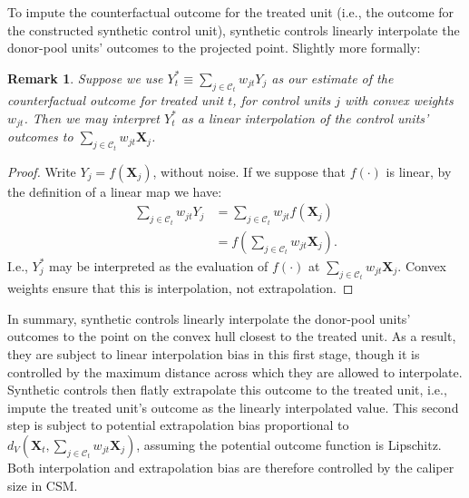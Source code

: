 \documentclass{article}
\newtheorem{remark}{Remark}
\newcommand{\Xt}{\mathbf{X}_t}
\newcommand{\Xj}{\mathbf{X}_j}
\newcommand{\Ct}{\mathcal{C}_{t}}
\newcommand{\note}[1]{\textcolor{red}{\textit{#1}}}
\begin{document}
To impute the counterfactual outcome for the treated unit (i.e., the outcome for the constructed synthetic control unit), synthetic controls linearly interpolate the donor-pool units' outcomes to the projected point.
Slightly more formally:
\begin{remark}
\label{rem:lin_interp}
    Suppose we use $Y_t^* \equiv \sum_{j \in \Ct} w_{jt} Y_j$ as our estimate of the counterfactual outcome for treated unit $t$, for control units $j$ with convex weights $w_{jt}$.
    Then we may interpret $Y_t^*$ as a linear interpolation of the control units' outcomes to $\sum_{j \in \Ct} w_{jt} \Xj$.
\end{remark}
\begin{proof}
    Write $Y_j = f(\Xj)$, without noise.
    If we suppose that $f(\cdot)$ is linear, by the definition of a linear map we have:
    \begin{align*}
        \sum_{j \in \Ct} w_{jt} Y_j
        &= \sum_{j \in \Ct} w_{jt} f(\Xj) \\
        &= f(\sum_{j \in \Ct} w_{jt} \Xj).
    \end{align*}
    I.e., $Y_j^*$ may be interpreted as the evaluation of $f(\cdot)$ at $\sum_{j \in \Ct} w_{jt} \Xj$.
    Convex weights ensure that this is interpolation, not extrapolation.
\end{proof}


In summary, synthetic controls linearly interpolate the donor-pool units' outcomes to the point on the convex hull closest to the treated unit.
As a result, they are subject to linear interpolation bias \citep{kellogg2021combining} in this first stage, though it is controlled by the maximum distance across which they are allowed to interpolate.
Synthetic controls then flatly extrapolate this outcome to the treated unit, i.e., impute the treated unit's outcome as the linearly interpolated value.
This second step is subject to potential extrapolation bias \citep{kellogg2021combining} proportional to $d_V(\Xt, \sum_{j \in \Ct} w_{jt} \Xj)$, assuming the potential outcome function is Lipschitz.
Both interpolation and extrapolation bias are therefore controlled by the caliper size in CSM.
\end{document}
